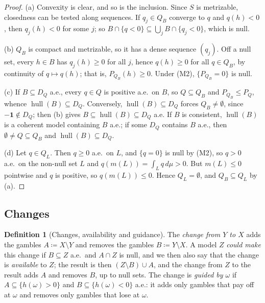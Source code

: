 \documentclass[11pt]{article}
\newcommand{\one}{\mathbf{1}}
\newcommand{\hull}{\operatorname{hull}}
\theoremstyle{plain}
\theoremstyle{definition}
\newtheorem{definition}[theorem]{Definition}
\theoremstyle{remark}
\begin{document}
\begin{proof}
(a) Convexity is clear, and so is the inclusion. Since $S$ is metrizable, closedness can be
tested along sequences. If $q_j\in Q_B$ converge to $q$ and $q(h)<0$, then $q_j(h)<0$ for
some $j$; so $B\cap\{q<0\}\subseteq\bigcup_jB\cap\{q_j<0\}$, which is null.

(b) $Q_B$ is compact and metrizable, so it has a dense sequence $(q_j)$. Off a null set,
every $h\in B$ has $q_j(h)\ge0$ for all $j$, hence $q(h)\ge0$ for all $q\in Q_B$, by
continuity of $q\mapsto q(h)$; that is, $P_{Q_B}(h)\ge0$. Under (M2), $\{P_{Q_B}=0\}$ is null.

(c) If $B\subseteq D_Q$ a.e., every $q\in Q$ is positive a.e.\ on $B$, so $Q\subseteq Q_B$
and $P_{Q_B}\le P_Q$, whence $\hull(B)\subseteq D_Q$. Conversely, $\hull(B)\subseteq D_Q$
forces $Q_B\ne\emptyset$, since $-\one\notin D_Q$; then (b) gives $B\subseteq\hull(B)
\subseteq D_Q$ a.e. If $B$ is consistent, $\hull(B)$ is a coherent model containing $B$ a.e.;
if some $D_Q$ contains $B$ a.e., then $\emptyset\ne Q\subseteq Q_B$ and $\hull(B)\subseteq D_Q$.

(d) Let $q\in Q_L$. Then $q\ge0$ a.e.\ on $L$, and $\{q=0\}$ is null by (M2), so $q>0$ a.e.\
on the non-null set $L$ and $q(m(L))=\int_Lq\,d\mu>0$. But $m(L)\le0$ pointwise and $q$ is
positive, so $q(m(L))\le0$. Hence $Q_L=\emptyset$, and $Q_B\subseteq Q_L$ by (a).
\end{proof}

\subsection{Changes}

\begin{definition}[Changes, availability and guidance]\label{def:change}
The \emph{change from $Y$ to $X$} adds the gambles $A\coloneqq X\setminus Y$ and removes the
gambles $B\coloneqq Y\setminus X$. A model $Z$ \emph{could make} this change if $B\subseteq Z$
a.e.\ and $A\cap Z$ is null, and we then also say that the change is \emph{available} to $Z$;
the result is then $(Z\setminus B)\cup A$, and the change from
$Z$ to the result adds $A$ and removes $B$, up to null sets. The change is \emph{guided by
$\omega$} if $A\subseteq\{h(\omega)>0\}$ and $B\subseteq\{h(\omega)<0\}$ a.e.: it adds only
gambles that pay off at $\omega$ and removes only gambles that lose at $\omega$.
\end{definition}
\end{document}
